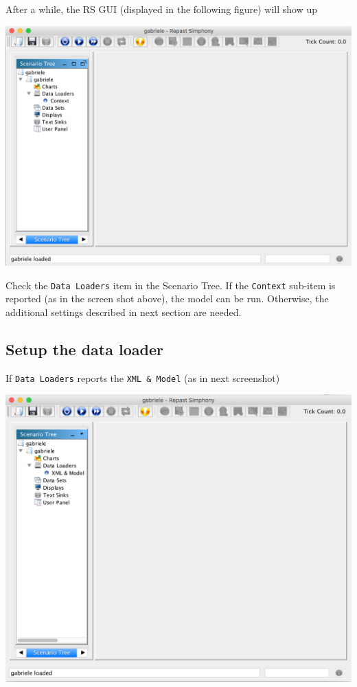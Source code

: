 \documentclass{book}
\begin{document}
After a while, the RS GUI (displayed in the following figure) will show up

\noindent
\includegraphics[scale=0.35]{fig_gabriele_rs_gui0}

Check the \verb+Data Loaders+ item in the Scenario Tree. If the \verb+Context+ sub-item is reported (as in the screen shot above), the model can be run. Otherwise, the additional settings described in next section are needed. 

\subsection{Setup the data loader}
If \verb+Data Loaders+ reports the \verb+XML & Model+ (as in next screenshot)

\includegraphics[scale=0.35]{fig_gabriele_rs_gui1}
\end{document}
